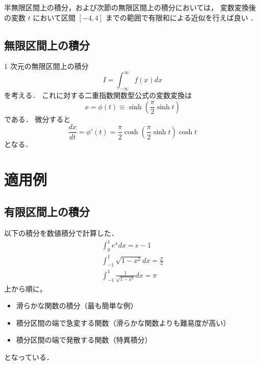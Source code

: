 半無限区間上の積分，および次節の無限区間上の積分においては，
変数変換後の変数 $t$ において区間 $[-4, 4]$ までの範囲で有限和による近似を行えば良い
\cite[4.5.3]{Press2007}．

\subsection{無限区間上の積分}

1 次元の無限区間上の積分
\begin{equation}
    I = \int_{-\infty}^{\infty} f(x) dx
\end{equation}
を考える．
これに対する二重指数関数型公式の変数変換は
\begin{equation}
    x = \phi(t) \equiv \sinh \left(\frac{\pi}{2} \sinh{t}\right)
\end{equation}
である\cite[Section 4.5.3]{Press2007}．
微分すると
\begin{equation}
    \frac{dx}{dt} = \phi'(t)
    = \frac{\pi}{2} \cosh \left(\frac{\pi}{2} \sinh{t}\right) \cosh{t}
\end{equation}
となる．

\section{適用例}

\subsection{有限区間上の積分}

以下の積分を数値積分で計算した．
\begin{gather}
    \int_{0}^{1} e^x dx = e - 1
    \label{eq:integration_one-dim_finite-exp-integration}
    \\
    \int_{-1}^{1} \sqrt{1-x^2} dx = \frac{\pi}{2}
    \label{eq:integration_one-dim_finite-sqrt-1mx2-integration}
    \\
    \int_{-1}^{1} \frac{1}{\sqrt{1-x^2}} dx = \pi
    \label{eq:integration_one-dim_finite-inv-sqrt-1mx2-integration}
\end{gather}
上から順に，
\begin{itemize}
    \item 滑らかな関数の積分（最も簡単な例）
    \item 積分区間の端で急変する関数（滑らかな関数よりも難易度が高い）
    \item 積分区間の端で発散する関数（特異積分）
\end{itemize}
となっている．

